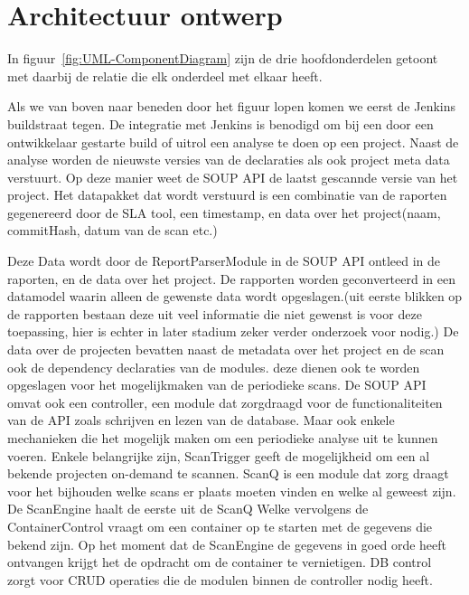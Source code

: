 \section{Architectuur ontwerp}\label{sec:architectuur-ontwerp}
In figuur~\ref{fig:UML-ComponentDiagram} zijn de drie hoofdonderdelen getoont met daarbij de relatie die elk onderdeel met elkaar heeft.

Als we van boven naar beneden door het figuur lopen komen we eerst de Jenkins buildstraat tegen. De integratie met Jenkins is benodigd om bij een door een ontwikkelaar gestarte build of uitrol een analyse te doen op een project. Naast de analyse worden de nieuwste versies van de declaraties als ook project meta data verstuurt. Op deze manier weet de SOUP API de laatst gescannde versie van het project. Het datapakket dat wordt verstuurd is een combinatie van de raporten gegenereerd door de SLA tool, een timestamp, en data over het project(naam, commitHash, datum van de scan etc.)

Deze Data wordt door de ReportParserModule in de SOUP API ontleed in de raporten, en de data over het project. De rapporten worden geconverteerd in een datamodel waarin alleen de gewenste data wordt opgeslagen.(uit eerste blikken op de rapporten bestaan deze uit veel informatie die niet gewenst is voor deze toepassing, hier is echter in later stadium zeker verder onderzoek voor nodig.) De data over de projecten bevatten naast de metadata over het project en de scan ook de dependency declaraties van de modules. deze dienen ook te worden opgeslagen voor het mogelijkmaken van de periodieke scans. De SOUP API omvat ook een controller, een module dat zorgdraagd voor de functionaliteiten van de API zoals schrijven en lezen van de database. Maar ook enkele mechanieken die het mogelijk maken om een periodieke analyse uit te kunnen voeren. Enkele belangrijke zijn,
ScanTrigger geeft de mogelijkheid om een al bekende projecten on-demand te scannen.
ScanQ is een module  dat zorg draagt voor het bijhouden welke scans er plaats moeten vinden en welke al geweest zijn. De ScanEngine haalt de eerste uit de ScanQ Welke vervolgens de ContainerControl vraagt om een container op te starten met de gegevens die bekend zijn. Op het moment dat de ScanEngine de gegevens in goed orde heeft ontvangen krijgt het de opdracht om de container te vernietigen. DB control zorgt voor CRUD operaties die de modulen binnen de controller nodig heeft.

